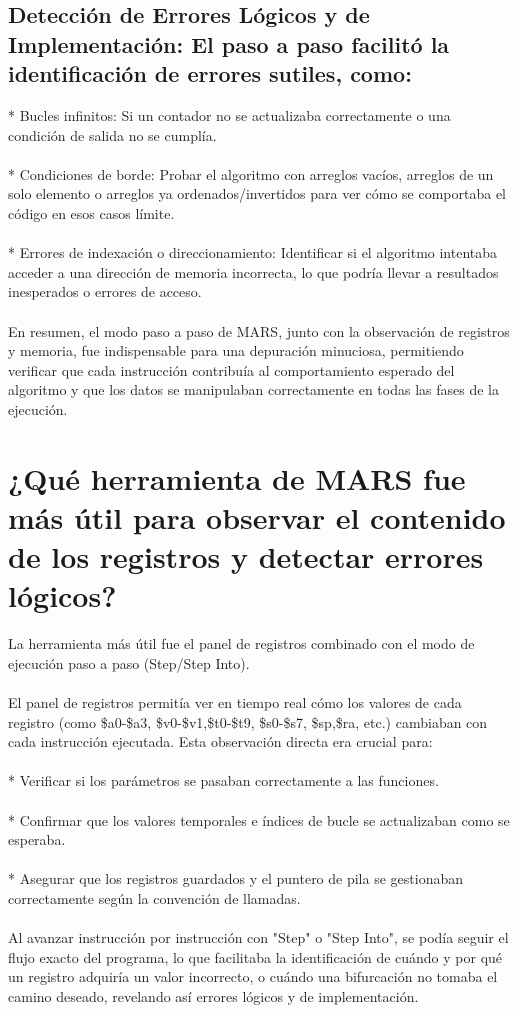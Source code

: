 \documentclass{article}
\begin{document}
\subsection{Detección de Errores Lógicos y de Implementación: El paso a paso facilitó la identificación de errores sutiles, como:}
* Bucles infinitos: Si un contador no se actualizaba correctamente o una condición de salida no se cumplía.
\\
\\* Condiciones de borde: Probar el algoritmo con arreglos vacíos, arreglos de un solo elemento o arreglos ya ordenados/invertidos para ver cómo se comportaba el código en esos casos límite.
\\
\\* Errores de indexación o direccionamiento: Identificar si el algoritmo intentaba acceder a una dirección de memoria incorrecta, lo que podría llevar a resultados inesperados o errores de acceso.
\\
\\En resumen, el modo paso a paso de MARS, junto con la observación de registros y memoria, fue indispensable para una depuración minuciosa, permitiendo verificar que cada instrucción contribuía al comportamiento esperado del algoritmo y que los datos se manipulaban correctamente en todas las fases de la ejecución.
\section{¿Qué herramienta de MARS fue más útil para observar el contenido de los registros y detectar errores lógicos?}
La herramienta más útil fue el panel de registros combinado con el modo de ejecución paso a paso (Step/Step Into).
\\
\\El panel de registros permitía ver en tiempo real cómo los valores de cada registro (como \$a0-\$a3, \$v0-\$v1,\$t0-\$t9, \$s0-\$s7, \$sp,\$ra, etc.) cambiaban con cada instrucción ejecutada. Esta observación directa era crucial para:
\\
\\* Verificar si los parámetros se pasaban correctamente a las funciones.
\\
\\* Confirmar que los valores temporales e índices de bucle se actualizaban como se esperaba.
\\
\\* Asegurar que los registros guardados y el puntero de pila se gestionaban correctamente según la convención de llamadas.
\\
\\Al avanzar instrucción por instrucción con "Step" o "Step Into", se podía seguir el flujo exacto del programa, lo que facilitaba la identificación de cuándo y por qué un registro adquiría un valor incorrecto, o cuándo una bifurcación no tomaba el camino deseado, revelando así errores lógicos y de implementación.
\end{document}
